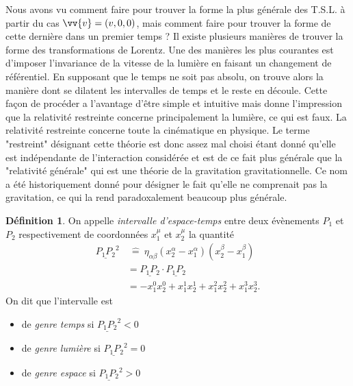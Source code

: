\documentclass[a4paper,11pt]{report}
\theoremstyle{definition}
\theoremstyle{plain}
\theoremstyle{definition}
\newtheorem{defn}{Définition}[chapter]
\theoremstyle{remark}
\begin{document}
            Nous avons vu comment faire pour trouver la forme la plus générale des T.S.L. à partir du cas $\vv{v} = (v,0,0)$, mais comment faire pour trouver la forme de cette dernière dans un premier temps ? Il existe plusieurs manières de trouver la forme des transformations de Lorentz. Une des manières les plus courantes est d'imposer l'invariance de la vitesse de la lumière en faisant un changement de référentiel. En supposant que le temps ne soit pas absolu, on trouve alors la manière dont se dilatent les intervalles de temps et le reste en découle. Cette façon de procéder a l'avantage d'être simple et intuitive mais donne l'impression que la relativité restreinte concerne principalement la lumière, ce qui est faux. La relativité restreinte concerne toute la cinématique en physique. Le terme "restreint" désignant cette théorie est donc assez mal choisi étant donné qu'elle est indépendante de l'interaction considérée et est de ce fait plus générale que la "relativité générale" qui est une théorie de la gravitation gravitationnelle. Ce nom a été historiquement donné pour désigner le fait qu'elle ne comprenait pas la gravitation, ce qui la rend paradoxalement beaucoup plus générale.
            
            \begin{defn}
                On appelle \textit{intervalle d'espace-temps} entre deux évènements $P_1$ et $P_2$ respectivement de coordonnées $x_1^\mu$ et $x_2^\mu$ la quantité
                \begin{align}
                    \underline{P_1P_2}^2&~\hat{=}~ \eta_{\alpha\beta}(x_2^\alpha-x_1^\alpha)(x_2^\beta-x_1^\beta) \\
                    &= \underline{P_1P_2}\cdot\underline{P_1P_2} \\
                    &= -x_1^0 x_2^0 + x_1^1 x_2^1 + x_1^2 x_2^2 + x_1^3 x_2^3.
                \end{align}
                $$$$
                On dit que l'intervalle est 
                \begin{itemize}[label = \textbullet]
                    \item de \textit{genre temps} si $\underline{P_1P_2}^2<0$
                    \item de \textit{genre lumière} si $\underline{P_1P_2}^2=0$
                    \item de \textit{genre espace} si $\underline{P_1P_2}^2>0$
                \end{itemize}
            \end{defn}
            
\end{document}
